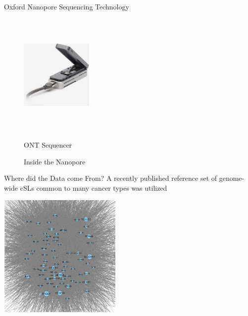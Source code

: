 \documentclass{beamer}
\begin{document}
	\begin{frame}{Oxford Nanopore Sequencing Technology}
		\centering
		\begin{figure}[!htb]
			\centering
			\begin{minipage}{.3\textwidth}
				\centering
				\includegraphics[width=3.5cm, height=6cm]{ont_machine.jpg}
				\caption{ONT Sequencer}
				\label{fig:prob1_6_2}
			\end{minipage}%
			\begin{minipage}{0.7\textwidth}
				\centering
				\caption{Inside the Nanopore}
				\label{fig:prob1_6_1}
			\end{minipage}
		\end{figure}
		
			
	\end{frame}

	\begin{frame}{Where did the Data come From?}
		A recently published reference set of genome-wide cSLs common to many cancer types was utilized
		\begin{center}
				\includegraphics[width=6cm,height=6cm]{corenet.png}
		\end{center}
	\end{frame}
\end{document}

